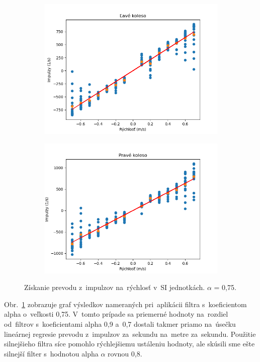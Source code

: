 \begin{figure}[!htbp]
	\begin{subfigure}{0.5\textwidth}
		\includegraphics[width=\textwidth]{img/lw_075250.png}
	\end{subfigure}
	\hfill
	\begin{subfigure}{0.5\textwidth}
		\includegraphics[width=\textwidth]{img/rw_075250.png}
	\end{subfigure}
	\caption{Získanie prevodu z~impulzov na~rýchlosť v~SI jednotkách. \(\alpha\) = 0,75.}
	\label{fig:rw_lw_075250}
\end{figure}

Obr.~\ref{fig:rw_lw_075250} zobrazuje graf výsledkov nameraných pri~aplikácii filtra s~koeficientom alpha o~veľkosti 0,75.
V~tomto prípade sa priemerné hodnoty na~rozdiel od~filtrov s~koeficientami alpha 0,9 a~0,7 dostali takmer priamo na~úsečku
lineárnej regresie prevodu z~impulzov za~sekundu na~metre za~sekundu. Použitie silnejšieho filtra síce pomohlo rýchlejšiemu
ustáleniu hodnoty, ale skúsili sme ešte silnejší filter s~hodnotou alpha $\alpha$ rovnou 0,8.

